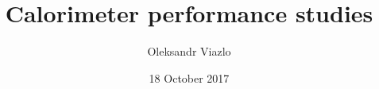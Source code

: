 \documentclass[8pt]{beamer}
\newif\ifplacelogo %
\begin{document}
\newcommand{\backupbegin}{
   \newcounter{finalframe}
   \setcounter{finalframe}{\value{framenumber}}
}
\newcommand{\backupend}{
   \setcounter{framenumber}{\value{finalframe}}
}

\newcommand{\myNode}{\tikz[baseline,inner sep=1pt] \node[anchor=base]}



\title[ Calorimeter performance studies \hspace{13.5em}\insertframenumber/
\inserttotalframenumber]{ Calorimeter performance studies }


	\author[Oleksandr Viazlo]{Oleksandr Viazlo \\ 
	}
	
       
	\date{18 October 2017}


	
   	\frame{\titlepage}

   	

\placelogofalse
\end{document}
